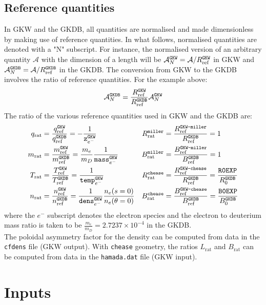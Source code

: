 \documentclass[a4paper]{report}
\begin{document}
\section{Reference quantities}
In GKW and the GKDB, all quantities are normalised and made dimensionless by making use of reference quantities. In what follows, normalised quantities are denoted with a "N" subscript. For instance, the normalised version of an arbitrary quantity $\mathcal{A}$ with the dimension of a length will be $\mathcal{A}_N^{\texttt{GKW}}=\mathcal{A}/R_{\textrm{ref}}^{\texttt{GKW}}$ in GKW and $\mathcal{A}_N^{\texttt{GKDB}}=\mathcal{A}/R_{\textrm{ref}}^{\texttt{GKDB}}$ in the GKDB. The conversion from GKW  to the GKDB  involves the ratio of reference quantities. For the example above:
\begin{equation}
\mathcal{A}_N^{\texttt{GKDB}} = \frac{R_{\textrm{ref}}^{\texttt{GKW}}}{R_{\textrm{ref}}^{\texttt{GKDB}}} \mathcal{A}_N^{\texttt{GKW}}
\end{equation}
The ratio of the various reference quantities used in GKW and the GKDB are:
\begin{align*}
q_\textrm{rat} &=  \frac{q_{\textrm{ref}}^{\texttt{GKW}}}{q_{\textrm{ref}}^{\texttt{GKDB}}} = - \frac{1}{\texttt{z}^{\texttt{GKW}}_{e^-}} & R_\textrm{rat}^\texttt{miller} &= \frac{R_{\textrm{ref}}^\texttt{GKW-miller}}{R_{\textrm{ref}}^{\texttt{GKDB}}} = 1 \\
m_\textrm{rat} &=  \frac{m_{\textrm{ref}}^{\texttt{GKW}}}{m_{\textrm{ref}}^{\texttt{GKDB}}} = \frac{m_e}{m_D}\frac{1}{\texttt{mass}^{\texttt{GKW}}_{e^-}} & B_\textrm{rat}^\texttt{miller} &= \frac{B_{\textrm{ref}}^\texttt{GKW-miller}}{B_{\textrm{ref}}^{\texttt{GKDB}}} = 1 \\
T_\textrm{rat} &=  \frac{T_{\textrm{ref}}^{\texttt{GKW}}}{T_{\textrm{ref}}^{\texttt{GKDB}}} = \frac{1}{\texttt{temp}^{\texttt{GKW}}_{e^-}} &R_\textrm{rat}^\texttt{chease} &= \frac{R_{\textrm{ref}}^\texttt{GKW-chease}}{R_{\textrm{ref}}^{\texttt{GKDB}}} = \frac{\texttt{R0EXP}}{R_0^{\texttt{GKDB}}}  \\
n_\textrm{rat} &=  \frac{n_{\textrm{ref}}^{\texttt{GKW}}}{n_{\textrm{ref}}^{\texttt{GKDB}}} = \frac{1}{\texttt{dens}^{\texttt{GKW}}_{e^-}} \frac{n_e(s=0)}{n_e(\theta=0)} & B_\textrm{rat}^\texttt{chease} &= \frac{B_{\textrm{ref}}^\texttt{GKW-chease}}{B_{\textrm{ref}}^{\texttt{GKDB}}} = \frac{\texttt{B0EXP}}{B_0^{\texttt{GKDB}}}
\end{align*}
where the $e^-$ subscript denotes the electron species and the electron to deuterium mass ratio is taken to be $\frac{m_e}{m_D}=2.7237 \times 10^{-4}$ in the GKDB.\\
The poloidal asymmetry factor for the density can be computed from data in the \texttt{cfdens} file (GKW output).  With \texttt{chease} geometry, the ratios $ L_\textrm{rat}$ and $ B_\textrm{rat}$ can be computed from data in the \texttt{hamada.dat} file (GKW input).


\chapter{Inputs}
\end{document}
